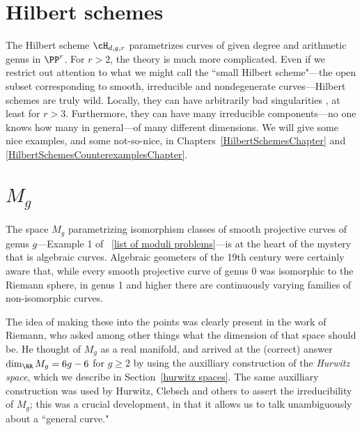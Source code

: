 \section{Hilbert schemes}\label{hilbert scheme section}
The Hilbert scheme $\cH_{d,g,r}$ parametrizes curves of given degree and arithmetic genus in $\PP^r$. For $r>2$, the theory is much more complicated.  Even if we restrict out attention to  what we might call the ``small Hilbert scheme"---the open subset corresponding to smooth, irreducible and nondegenerate curves---Hilbert schemes are truly wild. Locally, they can have arbitrarily bad singularities \cite{MR2227692}, at least for $r>3$. Furthermore, they can have many irreducible components---no one knows how many in general---of many different dimensions. We will give some nice examples, and some not-so-nice, in Chapters~\ref{HilbertSchemesChapter} and \ref{HilbertSchemesCounterexamplesChapter}.




\section{$M_g$}

The space $M_g$ parametrizing isomorphism classes of smooth projective curves of genus $g$---Example 1 of ~\ref{list of moduli problems}---is at the heart of the mystery that is algebraic curves. 
Algebraic geometers of the 19th century were certainly aware that, while every smooth projective curve of genus 0 was isomorphic to the Riemann sphere, in  genus 1 and higher there are continuously varying families of non-isomorphic curves. 

The idea of
making these into the points was clearly present in the work of Riemann, who asked among other things what the dimension of that space should be. He thought of $M_g$ as a real manifold, and arrived at the (correct) answer $\dim_\RR M_g = 6g-6$ for $g \geq 2$ by using the auxilliary construction of the \emph{Hurwitz space}, which we describe in Section~\ref{hurwitz spaces}. The same auxilliary construction was used by Hurwitz, Clebsch and others to assert the irreducibility of $M_g$; this was a crucial development, in that it allows us to talk unambiguously about a ``general curve."


